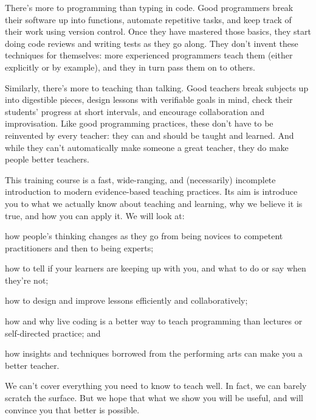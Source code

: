 
There's more to programming than typing in code.  Good programmers
break their software up into functions, automate repetitive tasks, and
keep track of their work using version control.  Once they have
mastered those basics, they start doing code reviews and writing tests
as they go along.  They don't invent these techniques for themselves:
more experienced programmers teach them (either explicitly or by
example), and they in turn pass them on to others.

Similarly, there's more to teaching than talking.  Good teachers break
subjects up into digestible pieces, design lessons with verifiable
goals in mind, check their students' progress at short intervals, and
encourage collaboration and improvisation.  Like good programming
practices, these don't have to be reinvented by every teacher: they
can and should be taught and learned.  And while they can't
automatically make someone a great teacher, they do make people better
teachers.

This training course is a fast, wide-ranging, and (necessarily)
incomplete introduction to modern evidence-based teaching practices.
Its aim is introduce you to what we actually know about teaching and
learning, why we believe it is true, and how you can apply it.  We
will look at:

\begin{gitemize}

\item
  how people's thinking changes as they go from being novices to
  competent practitioners and then to being experts;

\item
  how to tell if your learners are keeping up with you, and what to
  do or say when they're not;

\item
  how to design and improve lessons efficiently and collaboratively;

\item
  how and why live coding is a better way to teach programming than
  lectures or self-directed practice; and

\item
  how insights and techniques borrowed from the performing arts can
  make you a better teacher.

\end{gitemize}

We can't cover everything you need to know to teach well.  In fact,
we can barely scratch the surface.  But we hope that what we show you
will be useful, and will convince you that better is possible.

